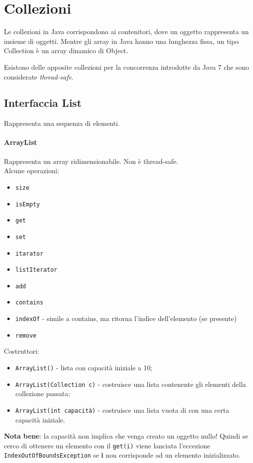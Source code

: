 \section{Collezioni}
Le collezioni in Java corrispondono ai contenitori, dove un oggetto rappresenta un insieme di oggetti. Mentre gli array in Java hanno una lunghezza fissa, un tipo Collection è un array dinamico di Object.

Esistono delle apposite collezioni per la concorrenza introdotte da Java 7 che sono considerate \textit{thread-safe}.

\subsection{Interfaccia List}
Rappresenta una sequenza di elementi. 
\paragraph{ArrayList}
Rappresenta un array ridimensionabile. Non è thread-safe. \\ Alcune operazioni:
\begin{itemize}
\item \texttt{size}
\item \texttt{isEmpty}
\item \texttt{get}
\item \texttt{set}
\item \texttt{itarator}
\item \texttt{listIterator}
\item \texttt{add}
\item \texttt{contains}
\item \texttt{indexOf} - simile a contains, ma ritorna l'indice dell'elemento (se presente)
\item \texttt{remove}
\end{itemize}
Costruttori:
\begin{itemize}
\item \texttt{ArrayList()} - lista con capacità iniziale a 10;
\item \texttt{ArrayList(Collection c)} - costruisce una lista contenente gli elementi della collezione passata;
\item \texttt{ArrayList(int capacità)} - costruisce una lista vuota di con una certa capacità iniziale.
\end{itemize}
\textbf{Nota bene}: la capacità non implica che venga creato un oggetto nullo! Quindi se cerco di ottenere un elemento con il \texttt{get(i)} viene lanciata l'eccezione \texttt{IndexOutOfBoundsException} se \textbf{i} non corrisponde ad un elemento inizializzato.

